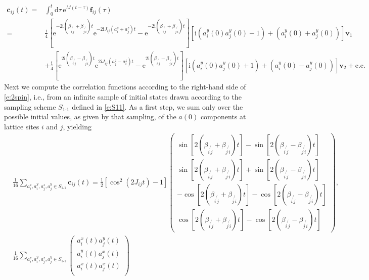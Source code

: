 \documentclass[aps,prl,showpacs,amsmath,amssymb,superscriptaddress,reprint,10pt]{revtex4-1}
\newcommand\dd{{\mathrm{d}}}
\newcommand\ee{{\mathrm{e}}}
\newcommand\ii{{\mathrm{i}}}
\newcommand{\mvec}[1]{\boldsymbol #1}
\begin{document}
\begin{widetext}
\begin{equation}
\begin{split}
 \mvec{c_{ij}}(t)=&\int_0^t \dd\tau\, \ee^{M(t-\tau)}\mvec{f_{ij}}(\tau)\\
=&\frac{\ii}{4}\left[\ee^{-2\ii (\beta_{i\not{\,j}}+\beta_{j\not{\,i}})t}\ee^{-2\ii J_{ij}(a_i^z+a_j^z)t}-\ee^{-2\ii (\beta_{i\not{\,j}}+\beta_{j\not{\,i}})t}\right]\left[\ii (a_i^y(0)a_j^y(0)-1)+(a_i^y(0)+a_j^y(0))\right]\mvec{v_1}\\
 &+\frac{\ii}{4} \left[\ee^{2\ii (\beta_{i\not{\,j}}-\beta_{j\not{\,i}})t}\ee^{2\ii J_{ij}(a_j^z-a_i^z)t}-\ee^{2\ii (\beta_{i\not{\,j}}-\beta_{j\not{\,i}})t}\right]\left[\ii (a_i^y(0)a_j^y(0)+1)+(a_i^y(0)-a_j^y(0))\right]\mvec{v_2}+\text{c.c.}
\end{split}
\end{equation}
Next we compute the correlation functions according to the right-hand side of \eqref{e:2spin}, i.e., from an infinite sample of initial states drawn according to the sampling scheme $S_{\text{1-1}}$ defined in \eqref{e:S11}. As a first step, we sum only over the possible initial values, as given by that sampling, of the $a(0)$ components at lattice sites $i$ and $j$, yielding
\begin{subequations}
\begin{align}
 &\frac{1}{16}\sum_{a_i^z,a_i^y,a_j^z,a_j^y\in S_{\text{1-1}}}\mvec{c_{ij}}(t)=
 \frac{1}{2}\left[\cos^2(2J_{ij}t)-1\right]\begin{pmatrix}
        \sin\left[2(\beta_{i\not{\,j}}+\beta_{j\not{\,i}})t\right]-\sin\left[2(\beta_{i\not{\,j}}-\beta_{j\not{\,i}})t\right]\\
        \sin\left[2(\beta_{i\not{\,j}}+\beta_{j\not{\,i}})t\right]+\sin\left[2(\beta_{i\not{\,j}}-\beta_{j\not{\,i}})t\right]\\
        -\cos\left[2(\beta_{i\not{\,j}}+\beta_{j\not{\,i}})t\right]-\cos\left[2(\beta_{i\not{\,j}}-\beta_{j\not{\,i}})t\right]\\
        \cos\left[2(\beta_{i\not{\,j}}+\beta_{j\not{\,i}})t\right]-\cos\left[2(\beta_{i\not{\,j}}-\beta_{j\not{\,i}})t\right]
       \end{pmatrix},\\
 &\frac{1}{16}\sum_{a_i^z,a_i^y,a_j^z,a_j^y\in S_{\text{1-1}}}
 \begin{pmatrix}
 a_i^x(t)a_j^y(t)\\
 a_i^y(t)a_j^x(t)\\
 a_i^x(t)a_j^x(t)\\

\end{pmatrix}
\end{align}
\end{subequations}
\end{widetext}
\end{document}
